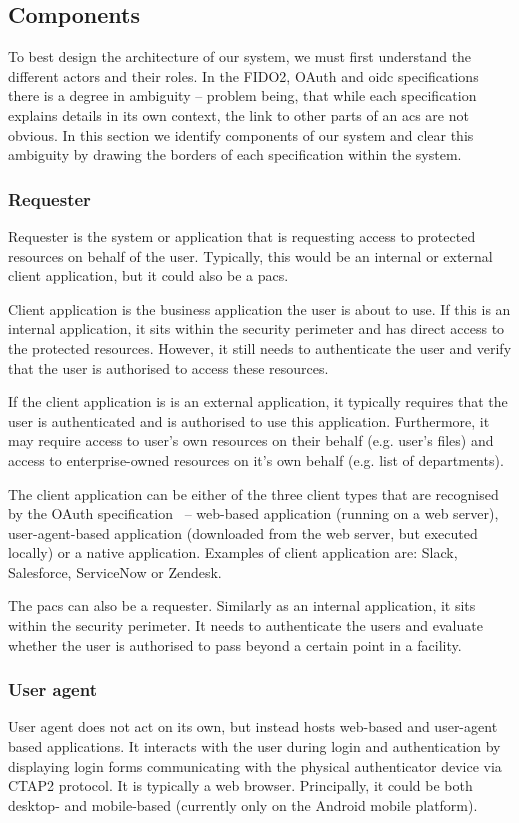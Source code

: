 \subsection{Components}
To best design the architecture of our system, we must first understand the different actors and their roles. In the FIDO2, OAuth and \acrshort{oidc} specifications there is a degree in ambiguity -- problem being, that while each specification explains details in its own context, the link to other parts of an \acrshort{acs} are not obvious. In this section we identify components of our system and clear this ambiguity by drawing the borders of each specification within the system.

\subsubsection{Requester} 
Requester is the system or application that is requesting access to protected resources on behalf of the user. Typically, this would be an internal or external client application, but it could also be a \acrshort{pacs}.

Client application is the business application the user is about to use. If this is an internal application, it sits within the security perimeter and has direct access to the protected resources. However, it still needs to authenticate the user and verify that the user is authorised to access these resources.

If the client application is is an external application, it typically requires that the user is authenticated and is authorised to use this application. Furthermore, it may require access to user's own resources on their behalf (e.g. user's files) and access to enterprise-owned resources on it's own behalf (e.g. list of departments).
    
The client application can be either of the three client types that are recognised by the OAuth specification~\cite{Hardt2012TheFramework} -- web-based application (running on a web server), user-agent-based application (downloaded from the web server, but executed locally) or a native application. Examples of client application are: Slack, Salesforce, ServiceNow or Zendesk.

The \acrshort{pacs} can also be a requester. Similarly as an internal application, it sits within the security perimeter. It needs to authenticate the users and evaluate whether the user is authorised to pass beyond a certain point in a facility.

\subsubsection{User agent}
User agent does not act on its own, but instead hosts web-based and user-agent based applications. It interacts with the user during login and authentication by displaying login forms communicating with the physical authenticator device via CTAP2 protocol\footnotemark. It is typically a web browser. Principally, it could be both desktop- and mobile-based (currently only on the Android mobile platform). 
% 

